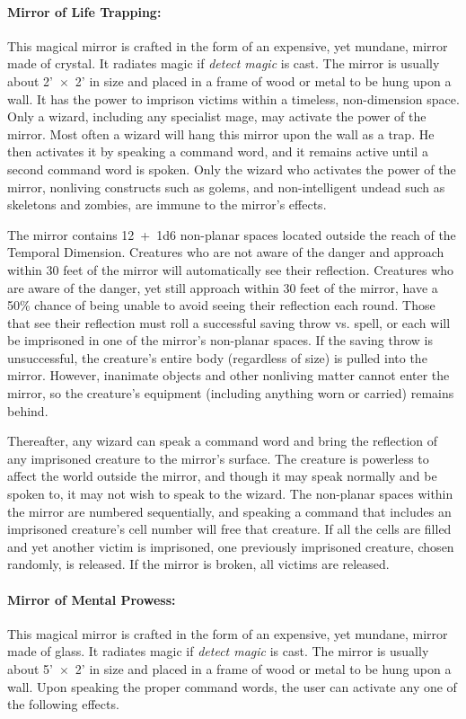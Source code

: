 \begin{multicols}{2}
\paragraph{Mirror of Life Trapping:} This magical mirror is crafted in the form of an expensive, yet mundane, mirror made of crystal.  It radiates magic if \textit{detect magic} is cast.  The mirror is usually about 2'~$\times$~2' in size and placed in a frame of wood or metal to be hung upon a wall.  It has the power to imprison victims within a timeless, non-dimension space.  Only a wizard, including any specialist mage, may activate the power of the mirror.  Most often a wizard will hang this mirror upon the wall as a trap.  He then activates it by speaking a command word, and it remains active until a second command word is spoken.  Only the wizard who activates the power of the mirror, nonliving constructs such as golems, and non-intelligent undead such as skeletons and zombies, are immune to the mirror's effects. 

The mirror contains 12~+~1d6 non-planar spaces located outside the reach of the Temporal Dimension.  Creatures who are not aware of the danger and approach within 30 feet of the mirror will automatically see their reflection.  Creatures who are aware of the danger, yet still approach within 30 feet of the mirror, have a 50\% chance of being unable to avoid seeing their reflection each round.  Those that see their reflection must roll a successful saving throw vs. spell, or each will be imprisoned in one of the mirror's non-planar spaces.  If the saving throw is unsuccessful, the creature's entire body (regardless of size) is pulled into the mirror.  However, inanimate objects and other nonliving matter cannot enter the mirror, so the creature's equipment (including anything worn or carried) remains behind.  

Thereafter, any wizard can speak a command word and bring the reflection of any imprisoned creature to the mirror's surface.  The creature is powerless to affect the world outside the mirror, and though it may speak normally and be spoken to, it may not wish to speak to the wizard.  The non-planar spaces within the mirror are numbered sequentially, and speaking a command that includes an imprisoned creature's cell number will free that creature.  If all the cells are filled and yet another victim is imprisoned, one previously imprisoned creature, chosen randomly, is released.  If the mirror is broken, all victims are released.
 
\paragraph{Mirror of Mental Prowess:} This magical mirror is crafted in the form of an expensive, yet mundane, mirror made of glass.  It radiates magic if \textit{detect magic} is cast.  The mirror is usually about 5'~$\times$~2' in size and placed in a frame of wood or metal to be hung upon a wall.  Upon speaking the proper command words, the user can activate any one of the following effects.


\end{multicols}
